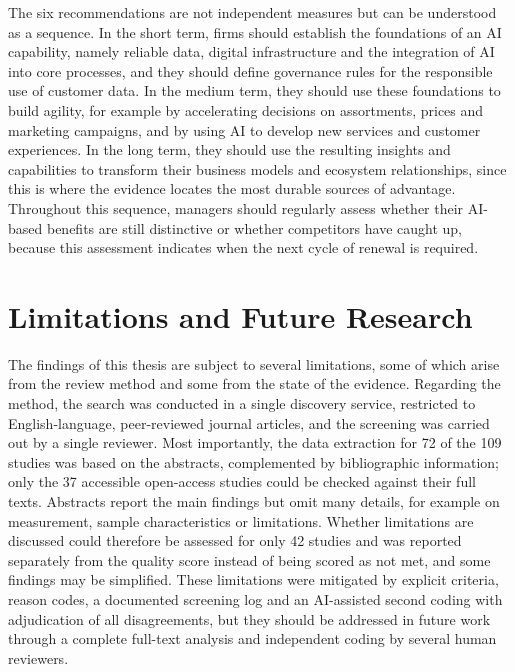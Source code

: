 The six recommendations are not independent measures but can be understood as a sequence. In the short term, firms should establish the foundations of an AI capability, namely reliable data, digital infrastructure and the integration of AI into core processes, and they should define governance rules for the responsible use of customer data. In the medium term, they should use these foundations to build agility, for example by accelerating decisions on assortments, prices and marketing campaigns, and by using AI to develop new services and customer experiences. In the long term, they should use the resulting insights and capabilities to transform their business models and ecosystem relationships, since this is where the evidence locates the most durable sources of advantage. Throughout this sequence, managers should regularly assess whether their AI-based benefits are still distinctive or whether competitors have caught up, because this assessment indicates when the next cycle of renewal is required.

\section{Limitations and Future Research}
\label{sec:future}

The findings of this thesis are subject to several limitations, some of which arise from the review method and some from the state of the evidence. Regarding the method, the search was conducted in a single discovery service, restricted to English-language, peer-reviewed journal articles, and the screening was carried out by a single reviewer. Most importantly, the data extraction for 72 of the 109 studies was based on the abstracts, complemented by bibliographic information; only the 37 accessible open-access studies could be checked against their full texts. Abstracts report the main findings but omit many details, for example on measurement, sample characteristics or limitations. Whether limitations are discussed could therefore be assessed for only 42 studies and was reported separately from the quality score instead of being scored as not met, and some findings may be simplified. These limitations were mitigated by explicit criteria, reason codes, a documented screening log and an AI-assisted second coding with adjudication of all disagreements, but they should be addressed in future work through a complete full-text analysis and independent coding by several human reviewers.

